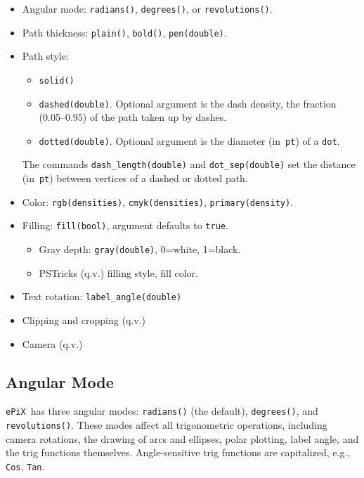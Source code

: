 \documentclass[12pt]{report}
\newcommand{\code}[1]{\texttt{#1}}
\newcommand{\ePiX}{\code{ePiX}}
\begin{document}
\begin{itemize}
\item Angular mode: \code{radians()}, \code{degrees()}, or
  \code{revolutions()}.

\item Path thickness: \code{plain()}, \code{bold()},
  \code{pen(double)}.

\item Path style:
  \begin{itemize}
  \item \code{solid()}
  \item \code{dashed(double)}. Optional argument is the dash density,
    the fraction (0.05--0.95) of the path taken up by dashes.
  \item \code{dotted(double)}. Optional argument is the diameter
    (in~\code{pt}) of a \code{dot}. 
  \end{itemize}
  The commands \code{dash\_length(double)} and \code{dot\_sep(double)}
  set the distance (in~\code{pt}) between vertices of a dashed or
  dotted path.
  
\item Color: \code{rgb(densities)}, \code{cmyk(densities)},
  \code{primary(density)}. 

\item Filling: \code{fill(bool)}, argument defaults to \code{true}.
  \begin{itemize}
    \item Gray depth: \code{gray(double)}, 0=white, 1=black.
    \item PSTricks (q.v.) filling style, fill color.
  \end{itemize}

\item Text rotation: \code{label\_angle(double)}

\item Clipping and cropping (q.v.)

\item Camera (q.v.)
\end{itemize}


\subsection*{Angular Mode} 

\ePiX\ has three angular modes: \code{radians()} (the default),
\code{degrees()}, and \code{revolutions()}.  These modes affect all
trigonometric operations, including camera rotations, the drawing of
arcs and ellipses, polar plotting, label angle, and the trig functions
themselves. Angle-sensitive trig functions are capitalized, e.g.,
\code{Cos}, \code{Tan}.
\end{document}
